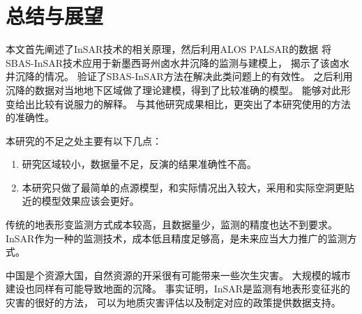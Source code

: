 \chapter{总结与展望}
本文首先阐述了InSAR技术的相关原理，然后利用ALOS PALSAR的数据
将SBAS-InSAR技术应用于新墨西哥州卤水井沉降的监测与建模上，
揭示了该卤水井沉降的情况。
验证了SBAS-InSAR方法在解决此类问题上的有效性。
之后利用沉降的数据对当地地下区域做了理论建模，得到了比较准确的模型。
能够对此形变给出比较有说服力的解释。
与其他研究成果相比，更突出了本研究使用的方法的准确性。

本研究的不足之处主要有以下几点：
\begin{enumerate}
    \item 研究区域较小，数据量不足，反演的结果准确性不高。
    \item 本研究只做了最简单的点源模型，和实际情况出入较大，采用和实际空洞更贴近的模型效果应该会更好。
\end{enumerate}

传统的地表形变监测方式成本较高，且数据量少，监测的精度也达不到要求。
InSAR作为一种的监测技术，成本低且精度足够高，是未来应当大力推广的监测方式。

中国是个资源大国，自然资源的开采很有可能带来一些次生灾害。
大规模的城市建设也同样有可能导致地面的沉降。
事实证明，InSAR是监测有地表形变征兆的灾害的很好的方法，
可以为地质灾害评估以及制定对应的政策提供数据支持。